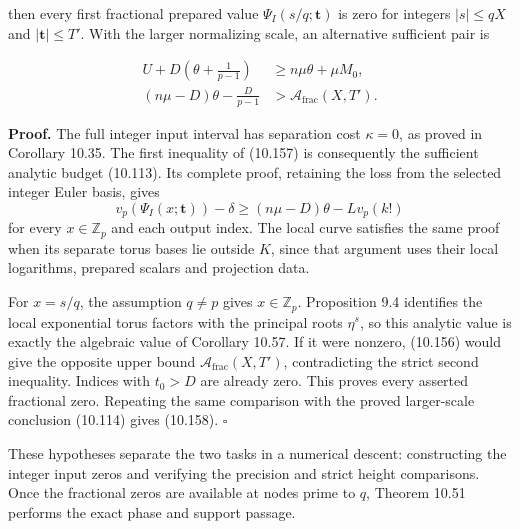 \documentclass[
  11pt,
  a4paper,
]{article}
\begin{document}
then every first fractional prepared value \(\Psi_I(s/q;\boldsymbol t)\)
is zero for integers \(|s|\le qX\) and \(|\boldsymbol t|\le T'\). With
the larger normalizing scale, an alternative sufficient pair is

\[
\begin{aligned}
U+D\left(\theta+\frac1{p-1}\right)&\ge n\mu\theta+\mu M_0,\\
(n\mu-D)\theta-\frac D{p-1}&>
\mathcal A_{\mathrm{frac}}(X,T').
\end{aligned}
\tag{10.158}
\]

\textbf{Proof.} The full integer input interval has separation cost
\(\kappa=0\), as proved in Corollary 10.35. The first inequality of
(10.157) is consequently the sufficient analytic budget (10.113). Its
complete proof, retaining the loss from the selected integer Euler
basis, gives \[
v_p(\Psi_I(x;\boldsymbol t))-\delta
\ge(n\mu-D)\theta-Lv_p(k!)
\] for every \(x\in\mathbb Z_p\) and each output index. The local curve
satisfies the same proof when its separate torus bases lie outside
\(K\), since that argument uses their local logarithms, prepared scalars
and projection data.

For \(x=s/q\), the assumption \(q\ne p\) gives \(x\in\mathbb Z_p\).
Proposition 9.4 identifies the local exponential torus factors with the
principal roots \(\eta^s\), so this analytic value is exactly the
algebraic value of Corollary 10.57. If it were nonzero, (10.156) would
give the opposite upper bound \(\mathcal A_{\mathrm{frac}}(X,T')\),
contradicting the strict second inequality. Indices with \(t_0>D\) are
already zero. This proves every asserted fractional zero. Repeating the
same comparison with the proved larger-scale conclusion (10.114) gives
(10.158). \(\square\)

These hypotheses separate the two tasks in a numerical descent:
constructing the integer input zeros and verifying the precision and
strict height comparisons. Once the fractional zeros are available at
nodes prime to \(q\), Theorem 10.51 performs the exact phase and support
passage.
\end{document}
